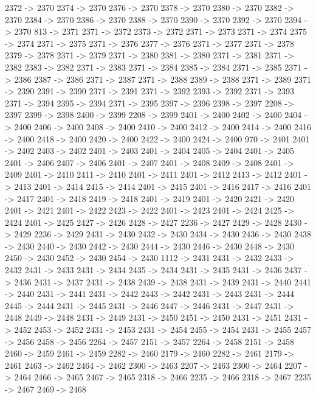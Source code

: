 {	2372 -> 2370
	2374 -> 2370
	2376 -> 2370
	2378 -> 2370
	2380 -> 2370
	2382 -> 2370
	2384 -> 2370
	2386 -> 2370
	2388 -> 2370
	2390 -> 2370
	2392 -> 2370
	2394 -> 2370
	813 -> 2371
	2371 -> 2372
	2373 -> 2372
	2371 -> 2373
	2371 -> 2374
	2375 -> 2374
	2371 -> 2375
	2371 -> 2376
	2377 -> 2376
	2371 -> 2377
	2371 -> 2378
	2379 -> 2378
	2371 -> 2379
	2371 -> 2380
	2381 -> 2380
	2371 -> 2381
	2371 -> 2382
	2383 -> 2382
	2371 -> 2383
	2371 -> 2384
	2385 -> 2384
	2371 -> 2385
	2371 -> 2386
	2387 -> 2386
	2371 -> 2387
	2371 -> 2388
	2389 -> 2388
	2371 -> 2389
	2371 -> 2390
	2391 -> 2390
	2371 -> 2391
	2371 -> 2392
	2393 -> 2392
	2371 -> 2393
	2371 -> 2394
	2395 -> 2394
	2371 -> 2395
	2397 -> 2396
	2398 -> 2397
	2208 -> 2397
	2399 -> 2398
	2400 -> 2399
	2208 -> 2399
	2401 -> 2400
	2402 -> 2400
	2404 -> 2400
	2406 -> 2400
	2408 -> 2400
	2410 -> 2400
	2412 -> 2400
	2414 -> 2400
	2416 -> 2400
	2418 -> 2400
	2420 -> 2400
	2422 -> 2400
	2424 -> 2400
	970 -> 2401
	2401 -> 2402
	2403 -> 2402
	2401 -> 2403
	2401 -> 2404
	2405 -> 2404
	2401 -> 2405
	2401 -> 2406
	2407 -> 2406
	2401 -> 2407
	2401 -> 2408
	2409 -> 2408
	2401 -> 2409
	2401 -> 2410
	2411 -> 2410
	2401 -> 2411
	2401 -> 2412
	2413 -> 2412
	2401 -> 2413
	2401 -> 2414
	2415 -> 2414
	2401 -> 2415
	2401 -> 2416
	2417 -> 2416
	2401 -> 2417
	2401 -> 2418
	2419 -> 2418
	2401 -> 2419
	2401 -> 2420
	2421 -> 2420
	2401 -> 2421
	2401 -> 2422
	2423 -> 2422
	2401 -> 2423
	2401 -> 2424
	2425 -> 2424
	2401 -> 2425
	2427 -> 2426
	2428 -> 2427
	2236 -> 2427
	2429 -> 2428
	2430 -> 2429
	2236 -> 2429
	2431 -> 2430
	2432 -> 2430
	2434 -> 2430
	2436 -> 2430
	2438 -> 2430
	2440 -> 2430
	2442 -> 2430
	2444 -> 2430
	2446 -> 2430
	2448 -> 2430
	2450 -> 2430
	2452 -> 2430
	2454 -> 2430
	1112 -> 2431
	2431 -> 2432
	2433 -> 2432
	2431 -> 2433
	2431 -> 2434
	2435 -> 2434
	2431 -> 2435
	2431 -> 2436
	2437 -> 2436
	2431 -> 2437
	2431 -> 2438
	2439 -> 2438
	2431 -> 2439
	2431 -> 2440
	2441 -> 2440
	2431 -> 2441
	2431 -> 2442
	2443 -> 2442
	2431 -> 2443
	2431 -> 2444
	2445 -> 2444
	2431 -> 2445
	2431 -> 2446
	2447 -> 2446
	2431 -> 2447
	2431 -> 2448
	2449 -> 2448
	2431 -> 2449
	2431 -> 2450
	2451 -> 2450
	2431 -> 2451
	2431 -> 2452
	2453 -> 2452
	2431 -> 2453
	2431 -> 2454
	2455 -> 2454
	2431 -> 2455
	2457 -> 2456
	2458 -> 2456
	2264 -> 2457
	2151 -> 2457
	2264 -> 2458
	2151 -> 2458
	2460 -> 2459
	2461 -> 2459
	2282 -> 2460
	2179 -> 2460
	2282 -> 2461
	2179 -> 2461
	2463 -> 2462
	2464 -> 2462
	2300 -> 2463
	2207 -> 2463
	2300 -> 2464
	2207 -> 2464
	2466 -> 2465
	2467 -> 2465
	2318 -> 2466
	2235 -> 2466
	2318 -> 2467
	2235 -> 2467
	2469 -> 2468
}
